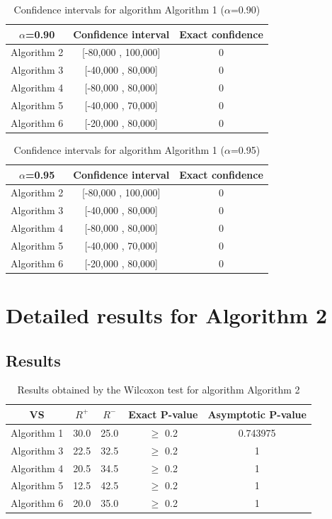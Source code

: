 \documentclass[a4paper,10pt]{article}
\begin{document}
\begin{table}[!htp]
\centering\small
\begin{tabular}{
|c|c|c|}
\hline
 $\alpha$=0.90 & Confidence interval & Exact confidence \\ \hline 
Algorithm 2 & [-80,000 , 100,000] & 0\\ \hline 
Algorithm 3 & [-40,000 , 80,000] & 0\\ \hline 
Algorithm 4 & [-80,000 , 80,000] & 0\\ \hline 
Algorithm 5 & [-40,000 , 70,000] & 0\\ \hline 
Algorithm 6 & [-20,000 , 80,000] & 0\\ \hline 

\end{tabular}
\caption{Confidence intervals for algorithm Algorithm 1 ($\alpha$=0.90)}
\end{table}
\begin{table}[!htp]
\centering\small
\begin{tabular}{
|c|c|c|}
\hline
 $\alpha$=0.95 & Confidence interval & Exact confidence \\ \hline 
Algorithm 2 & [-80,000 , 100,000] & 0\\ \hline 
Algorithm 3 & [-40,000 , 80,000] & 0\\ \hline 
Algorithm 4 & [-80,000 , 80,000] & 0\\ \hline 
Algorithm 5 & [-40,000 , 70,000] & 0\\ \hline 
Algorithm 6 & [-20,000 , 80,000] & 0\\ \hline 

\end{tabular}
\caption{Confidence intervals for algorithm Algorithm 1 ($\alpha$=0.95)}
\end{table}

 \clearpage 


\section{Detailed results for Algorithm 2}


\subsection{Results}

\begin{table}[!htp]
\centering\small
\begin{tabular}{
|c|c|c|c|c|}
\hline
 VS & $R^{+}$ & $R^{-}$ & Exact P-value & Asymptotic P-value \\ \hline 
Algorithm 1 & 30.0 & 25.0 & $\geq$ 0.2 & 0.743975\\ \hline 
Algorithm 3 & 22.5 & 32.5 & $\geq$ 0.2 & 1\\ \hline 
Algorithm 4 & 20.5 & 34.5 & $\geq$ 0.2 & 1\\ \hline 
Algorithm 5 & 12.5 & 42.5 & $\geq$ 0.2 & 1\\ \hline 
Algorithm 6 & 20.0 & 35.0 & $\geq$ 0.2 & 1\\ \hline 

\end{tabular}
\caption{Results obtained by the Wilcoxon test for algorithm Algorithm 2}
\end{table}
\end{document}

